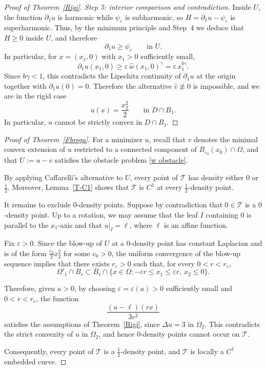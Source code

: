 \documentclass[reqno,11pt]{amsart}
\numberwithin{equation}{section}
\theoremstyle{remark}
\begin{document}
\begin{proof}[Proof of Theorem~\ref{Rigi}]
\medskip
\noindent\textit{Step 5: interior comparison and contradiction.}
Inside $U$, the function $\partial_1u$ is harmonic while $\psi_\varepsilon$ is subharmonic,
so $H=\partial_1u-\psi_\varepsilon$ is superharmonic.
Thus, by the minimum principle and Step~4 we deduce that
$H\ge0$ inside $U$, and therefore
\[
\partial_1u\ge \psi_\varepsilon
\qquad\text{in }U.
\]
In particular, for $x=(x_1,0)$ with $x_1>0$ sufficiently small,
\[
\partial_1u(x_1,0)\ge \varepsilon\,\hat w(x_1,0)^\gamma
=
\varepsilon\,x_1^{b\gamma}.
\]
Since $b\gamma<1$, this contradicts the Lipschitz continuity of $\partial_1u$ at the origin
together with $\partial_1u(0)=0$.
Therefore the alternative $\hat v\not\equiv0$ is impossible, and we are in the rigid case
\[
u(x)=\frac{x_2^2}{2}
\qquad\text{in }D\cap B_1.
\]
In particular, $u$ cannot be strictly convex in $D\cap B_1$.
\end{proof}

\begin{proof}[Proof of Theorem~\ref{Fbregu}]
For a minimizer $u$, recall that $v$ denotes the minimal convex extension of $u$ restricted to a connected component of $B_{\varepsilon_0}(x_0)\cap\Omega$, and that $U:=u-v$ satisfies the obstacle problem \eqref{w obstacle}.

By applying Caffarelli's alternative to $U$, every point of $\mathcal T$ has density either $0$ or $\frac12$. Moreover, Lemma~\ref{T-C1} shows that $\mathcal T$ is $C^1$ at every $\frac12$-density point.

It remains to exclude $0$-density points. Suppose by contradiction that $0\in \mathcal T$ is a $0$-density point. Up to a rotation, we may assume that the leaf $I$ containing $0$ is parallel to the $x_1$-axis and that $u|_I=\ell$, where $\ell$ is an affine function.

Fix $\varepsilon>0$. Since the blow-up of $U$ at a $0$-density point has constant Laplacian and is of the form $\frac{c_0}{2}x_2^2$ for some $c_0>0$, the uniform convergence of the blow-up sequence implies that there exists $r_\varepsilon>0$ such that, for every $0<r<r_\varepsilon$,
\[
\Omega'_1\cap B_r \subset B_r \cap \{x\in \Omega : -\varepsilon r \le x_1 \le \varepsilon r,\ x_2 \le 0\}.
\]

Therefore, given $a>0$, by choosing $\varepsilon=\varepsilon(a)>0$ sufficiently small and $0<r<r_\varepsilon$, the function
\[
\frac{(u-\ell)(rx)}{3r^2}
\]
satisfies the assumptions of Theorem~\ref{Rigi}, since $\Delta u=3$ in $\Omega_2$. This contradicts the strict convexity of $u$ in $\Omega_2$, and hence $0$-density points cannot occur on $\mathcal T$.

Consequently, every point of $\mathcal T$ is a $\frac12$-density point, and $\mathcal T$ is locally a $C^1$ embedded curve.
\end{proof}
\end{document}

